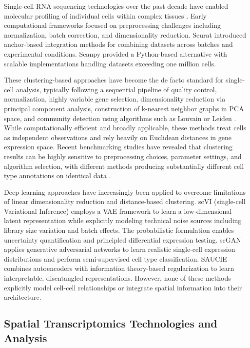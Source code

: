 \documentclass{article}
\begin{document}
Single-cell RNA sequencing technologies over the past decade have enabled molecular profiling of individual cells within complex tissues \citep{tanay2017scaling}. Early computational frameworks focused on preprocessing challenges including normalization, batch correction, and dimensionality reduction. Seurat \citep{satija2015spatial} introduced anchor-based integration methods for combining datasets across batches and experimental conditions. Scanpy \citep{wolf2018scanpy} provided a Python-based alternative with scalable implementations handling datasets exceeding one million cells.

These clustering-based approaches have become the de facto standard for single-cell analysis, typically following a sequential pipeline of quality control, normalization, highly variable gene selection, dimensionality reduction via principal component analysis, construction of k-nearest neighbor graphs in PCA space, and community detection using algorithms such as Louvain or Leiden \citep{traag2019louvain}. While computationally efficient and broadly applicable, these methods treat cells as independent observations and rely heavily on Euclidean distances in gene expression space. Recent benchmarking studies have revealed that clustering results can be highly sensitive to preprocessing choices, parameter settings, and algorithm selection, with different methods producing substantially different cell type annotations on identical data \citep{luecken2019current}.

Deep learning approaches have increasingly been applied to overcome limitations of linear dimensionality reduction and distance-based clustering. scVI (single-cell Variational Inference) \citep{lopez2018deep} employs a VAE framework to learn a low-dimensional latent representation while explicitly modeling technical noise sources including library size variation and batch effects. The probabilistic formulation enables uncertainty quantification and principled differential expression testing. scGAN \citep{marouf2020realistic} applies generative adversarial networks to learn realistic single-cell expression distributions and perform semi-supervised cell type classification. SAUCIE \citep{amodio2019exploring} combines autoencoders with information theory-based regularization to learn interpretable, disentangled representations. However, none of these methods explicitly model cell-cell relationships or integrate spatial information into their architecture.

\subsection{Spatial Transcriptomics Technologies and Analysis}
\end{document}
